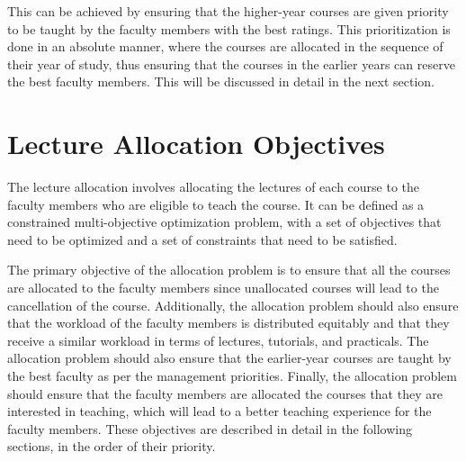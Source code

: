 This can be achieved by ensuring that the higher-year courses are given priority to be taught by the faculty members with the best ratings. This prioritization is done in an absolute manner, where the courses are allocated in the sequence of their year of study, thus ensuring that the courses in the earlier years can reserve the best faculty members. This will be discussed in detail in the next section.


\section{Lecture Allocation Objectives}
\label{sec:defining_the_allocation_problem}

The lecture allocation involves allocating the lectures of each course to the faculty members who are eligible to teach the course. It can be defined as a constrained multi-objective optimization problem, with a set of objectives that need to be optimized and a set of constraints that need to be satisfied.

The primary objective of the allocation problem is to ensure that all the courses are allocated to the faculty members since unallocated courses will lead to the cancellation of the course. Additionally, the allocation problem should also ensure that the workload of the faculty members is distributed equitably and that they receive a similar workload in terms of lectures, tutorials, and practicals. The allocation problem should also ensure that the earlier-year courses are taught by the best faculty as per the management priorities. Finally, the allocation problem should ensure that the faculty members are allocated the courses that they are interested in teaching, which will lead to a better teaching experience for the faculty members. These objectives are described in detail in the following sections, in the order of their priority.

